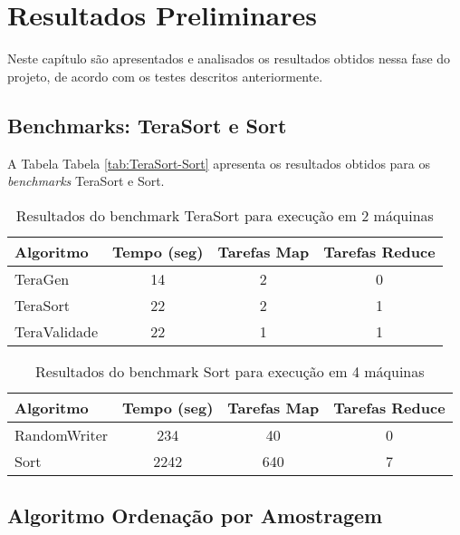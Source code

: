 \chapter{Resultados Preliminares}
\label{cap:resultados}

Neste capítulo são apresentados e analisados os resultados obtidos nessa fase do projeto, de acordo com os testes descritos anteriormente.

\section{Benchmarks: TeraSort e Sort}

A Tabela Tabela \ref{tab:TeraSort-Sort} apresenta os resultados obtidos para os \textit{benchmarks} TeraSort e Sort. 

\begin{table}[htbp]
\caption{Resultados do benchmark TeraSort para execução em 2 máquinas}
\begin{center}
\begin{tabular}{|l|ccc|} \hline
Algoritmo 		&Tempo (seg)	 	&Tarefas Map 	&Tarefas Reduce \\ \hline \hline
TeraGen 			&14			&2					&0						\\ \hline 
TeraSort			&22			&2					&1						\\ \hline 
TeraValidade 	&22			&1					&1						\\ \hline 
\end{tabular}
\end{center}
\label{tab:TeraSort}
\end{table}

\begin{table}[htbp]
\caption{Resultados do benchmark Sort para execução em 4 máquinas}
\begin{center}
\begin{tabular}{|l|ccc|} \hline
Algoritmo 		&Tempo (seg) 	&Tarefas Map 	&Tarefas Reduce\\ \hline \hline
RandomWriter 	&234				&40					&0						\\ \hline 
Sort					&2242				&640				&7						\\ \hline 
\end{tabular}
\end{center}
\label{tab:Sort}
\end{table}

\section{Algoritmo Ordenação por Amostragem}

